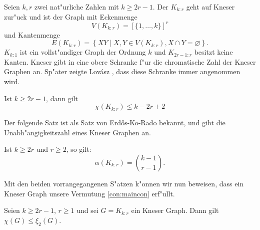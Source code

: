 Seien $k,r$ zwei nat"urliche Zahlen mit $k\geq 2r-1$. Der  $K_{k:r}$ geht auf Kneser \cite{Kneser55} zur"uck und ist der Graph mit Eckenmenge $$V(K_{k:r}) = [\{1,\dots,k\}]^{r}$$ und Kantenmenge 
$$E(K_{k:r}) = \left\{ XY\;|\; X,Y \in V(K_{k:r}), X \cap Y = \varnothing \right\}.$$ 
$K_{k:1}$ ist ein vollst"andiger Graph der Ordnung $k$ und $K_{2r-1:r}$ besitzt keine Kanten. Kneser gibt in \cite{Kneser55} eine obere Schranke f"ur die chromatische Zahl der Kneser Graphen an. Sp"ater zeigte Lov\'asz , dass diese Schranke immer angenommen wird.
\begin{theorem}
  Ist $k\geq 2r-1$, dann gilt
  $$\chi(K_{k:r}) \leq k-2r+2$$ \label{thm:kneserfarbung}
\end{theorem}
Der folgende Satz ist als Satz von Erd\H{o}s-Ko-Rado \cite{ErdosKoRado61} bekannt, und gibt die Unabh"angigkeitszahl eines Kneser Graphen an.
\begin{theorem}
  Ist $k\geq 2r$ und $r \geq 2$, so gilt: 
  $$\alpha(K_{k:r})= \binom{k-1}{r-1}.$$
  \label{thm:ErdosKoRado}
\end{theorem}
Mit den beiden vorrangegangenen S"atzen k"onnen wir nun beweisen, dass ein Kneser Graph unsere Vermutung \ref{con:maincon} erf"ullt. 
\begin{proposition}
  Seien $k\geq 2r-1$, $r\geq 1$ und sei $G= K_{k:r}$ ein Kneser Graph. Dann gilt $\chi(G) \leq \xi_{2}(G)$. 
\end{proposition}

